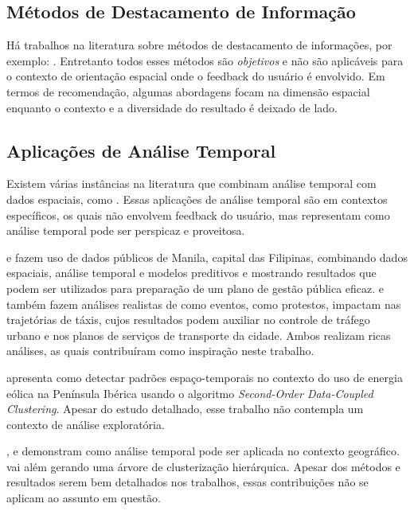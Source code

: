 \subsection{Métodos de Destacamento de Informação}


Há trabalhos na literatura sobre métodos de destacamento de informações, por exemplo: . Entretanto todos esses métodos são {\em objetivos} e não são aplicáveis para o contexto de orientação espacial onde o feedback do usuário é envolvido. Em termos de recomendação, algumas abordagens focam na dimensão espacial \cite{Bao2015,Levandoski:2012} enquanto o contexto e a diversidade do resultado é deixado de lado.

\subsection{Aplicações de Análise Temporal}

Existem várias instâncias na literatura que combinam análise temporal com dados espaciais, como . Essas aplicações de análise temporal são em contextos específicos, os quais não envolvem feedback do usuário, mas representam como análise temporal pode ser perspicaz e proveitosa.

 e  fazem uso de dados públicos de Manila, capital das Filipinas, combinando dados espaciais, análise temporal e modelos preditivos e mostrando resultados que podem ser utilizados para preparação de um plano de gestão pública eficaz.  e  também fazem análises realistas de como eventos, como protestos, impactam nas trajetórias de táxis, cujos resultados podem auxiliar no controle de tráfego urbano e nos planos de serviços de transporte da cidade. Ambos realizam ricas análises, as quais contribuíram como inspiração neste trabalho.

 apresenta como detectar padrões espaço-temporais no contexto do uso de energia eólica na Península Ibérica usando o algoritmo {\em Second-Order Data-Coupled Clustering}. Apesar do estudo detalhado, esse trabalho não contempla um contexto de análise exploratória.

,  e  demonstram como análise temporal pode ser aplicada no contexto geográfico.  vai além gerando uma árvore de clusterização hierárquica. Apesar dos métodos e resultados serem bem detalhados nos trabalhos, essas contribuições não se aplicam ao assunto em questão.

